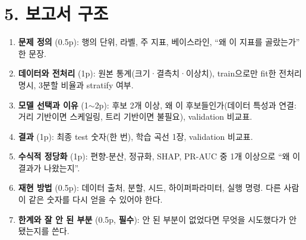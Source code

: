 \documentclass[12pt]{article}
\begin{document}
\section*{5. 보고서 구조}
\begin{enumerate}
\item \textbf{문제 정의} (0.5p): 행의 단위, 라벨, 주 지표,
  베이스라인, ``왜 이 지표를 골랐는가'' 한 문장.
\item \textbf{데이터와 전처리} (1p): 원본 통계(크기·결측치·이상치),
  train으로만 fit한 전처리 명시, 3분할 비율과 stratify 여부.
\item \textbf{모델 선택과 이유} (1$\sim$2p): 후보 2개 이상, 왜 이
  후보들인가(데이터 특성과 연결: 거리 기반이면 스케일링, 트리
  기반이면 불필요), validation 비교표.
\item \textbf{결과} (1p): 최종 test 숫자(한 번), 학습 곡선 1장,
  validation 비교표.
\item \textbf{수식적 정당화} (1p): 편향-분산, 정규화, SHAP, PR-AUC
  중 1개 이상으로 ``왜 이 결과가 나왔는지''.
\item \textbf{재현 방법} (0.5p): 데이터 출처, 분할, 시드, 하이퍼파라미터, 실행 명령. 다른 사람이 같은 숫자를 다시 얻을 수 있어야 한다.
\item \textbf{한계와 잘 안 된 부분} (0.5p, \textbf{필수}): 안
  된 부분이 없었다면 무엇을 시도했다가 안 됐는지를 쓴다.
\end{enumerate}
\end{document}
